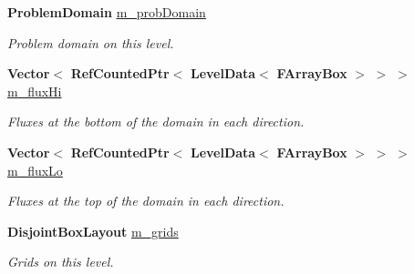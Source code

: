 \begin{DoxyCompactItemize}
\item 
\mbox{\label{class_level_domain_flux_register_a4f642cc0c7df84538ae9e5c5a5f0e584}} 
\textbf{ Problem\+Domain} \hyperlink{class_level_domain_flux_register_a4f642cc0c7df84538ae9e5c5a5f0e584}{m\+\_\+prob\+Domain}
\begin{DoxyCompactList}\small\item\em Problem domain on this level. \end{DoxyCompactList}\item 
\mbox{\label{class_level_domain_flux_register_a662bdaf7ec340751da77b1ffe71adc43}} 
\textbf{ Vector}$<$ \textbf{ Ref\+Counted\+Ptr}$<$ \textbf{ Level\+Data}$<$ \textbf{ F\+Array\+Box} $>$ $>$ $>$ \hyperlink{class_level_domain_flux_register_a662bdaf7ec340751da77b1ffe71adc43}{m\+\_\+flux\+Hi}
\begin{DoxyCompactList}\small\item\em Fluxes at the bottom of the domain in each direction. \end{DoxyCompactList}\item 
\mbox{\label{class_level_domain_flux_register_a5f3d90f846e3e0a92b69a9a63ee6c912}} 
\textbf{ Vector}$<$ \textbf{ Ref\+Counted\+Ptr}$<$ \textbf{ Level\+Data}$<$ \textbf{ F\+Array\+Box} $>$ $>$ $>$ \hyperlink{class_level_domain_flux_register_a5f3d90f846e3e0a92b69a9a63ee6c912}{m\+\_\+flux\+Lo}
\begin{DoxyCompactList}\small\item\em Fluxes at the top of the domain in each direction. \end{DoxyCompactList}\item 
\mbox{\label{class_level_domain_flux_register_aa7b01593260099c608e8fdbc546502ff}} 
\textbf{ Disjoint\+Box\+Layout} \hyperlink{class_level_domain_flux_register_aa7b01593260099c608e8fdbc546502ff}{m\+\_\+grids}
\begin{DoxyCompactList}\small\item\em Grids on this level. \end{DoxyCompactList}\item 
\mbox{\label{class_level_domain_flux_register_a1ba404111f25881482c72692c741a01f}} 

\end{DoxyCompactItemize}
